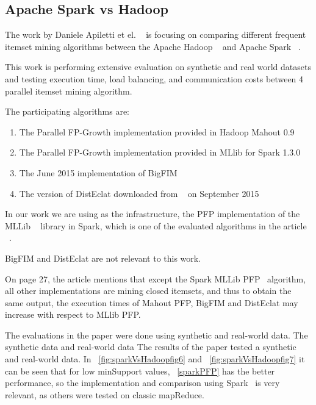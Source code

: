 \subsection{Apache Spark vs Hadoop}
\label{sec:sparkvhadoop}
The work by Daniele Apiletti et el. ~\cite{APILETTI201767} is focusing on comparing different frequent itemset mining algorithms between the Apache Hadoop ~\cite{hadoop} and Apache Spark ~\cite{spark}.

This work is performing extensive evaluation on synthetic and real world datasets and testing execution time, load balancing, and communication costs between 4 parallel itemset mining algorithm.

The participating algorithms are:
\begin{enumerate}[label=\textbf{SparkVsHadoop.\arabic*}]
\item \label{hadoopPFP} The Parallel FP-Growth implementation provided in Hadoop  Mahout 0.9 ~\cite{mahoot}
\item \label{sparkPFP} The Parallel FP-Growth implementation provided in MLlib for Spark
1.3.0 ~\cite{mllib}
\item The June 2015 implementation of BigFIM ~\cite{bigfim} 
\item The version of DistEclat downloaded from ~\cite{bigfim} on September 2015
\end{enumerate}
In our work we are using as the infrastructure, the PFP implementation of the MLLib ~\cite{mllib}  library in Spark,  which is one of the evaluated algorithms in the article ~\cite{APILETTI201767}.

BigFIM and DistEclat are not relevant to this work.

On page 27, the article mentions that except the Spark MLLib PFP~\cite{mllib} algorithm, all other implementations are mining closed itemsets,  and thus to obtain the
same output, the execution times of Mahout PFP, BigFIM and DistEclat may increase
with respect to MLlib PFP.

The evaluations in the paper were done using synthetic and real-world data.
The synthetic data and real-world data 
The results of the paper tested a synthetic and real-world data. In ~\autoref{fig:sparkVsHadoopfig6} and ~\autoref{fig:sparkVsHadoopfig7} it can be seen that for low minSupport values,  ~\autoref{sparkPFP} has the better performance, so the implementation and comparison using Spark~\cite{spark} is very relevant, as others were tested on classic mapReduce.



